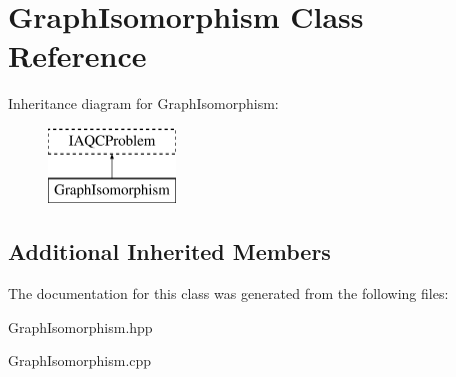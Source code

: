 \hypertarget{a00065}{}\section{Graph\+Isomorphism Class Reference}
\label{a00065}
Inheritance diagram for Graph\+Isomorphism\+:\begin{figure}[H]
\begin{center}
\leavevmode
\includegraphics[height=2.000000cm]{a00065}
\end{center}
\end{figure}
\subsection*{Additional Inherited Members}


The documentation for this class was generated from the following files\+:\begin{DoxyCompactItemize}
\item 
Graph\+Isomorphism.\+hpp\item 
Graph\+Isomorphism.\+cpp\end{DoxyCompactItemize}
